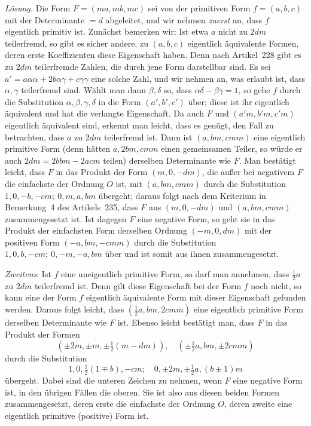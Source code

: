 \textit{Lösung.} Die Form $F=(ma,mb,mc)$ sei von der primitiven Form $f=(a,b,c)$ mit der Determinante $=d$ abgeleitet, und wir nehmen \textit{zuerst} an, dass $f$ eigentlich primitiv ist. Zunächst bemerken wir: Ist etwa $a$ nicht zu $2dm$ teilerfremd, so gibt es sicher andere, zu $(a,b,c)$ eigentlich äquivalente Formen, deren erste Koeffizienten diese Eigenschaft haben. Denn nach Artikel~228 gibt es zu $2dm$ teilerfremde Zahlen, die durch jene Form darstellbar sind. Es sei $a'=a\alpha\alpha+2b\alpha\gamma+c\gamma\gamma$ eine solche Zahl, und wir nehmen an, was erlaubt ist, dass $\alpha,\gamma$ teilerfremd sind. Wählt man dann $\beta,\delta$ so, dass $\alpha\delta-\beta\gamma=1$, so gehe $f$ durch die Substitution $\alpha,\beta,\gamma,\delta$ in die Form $(a',b',c')$ über; diese ist ihr eigentlich äquivalent und hat die verlangte Eigenschaft. Da auch $F$ und $(a'm,b'm,c'm)$ eigentlich äquivalent sind, erkennt man leicht, dass es genügt, den Fall zu betrachten, dass $a$ zu $2dm$ teilerfremd ist. Dann ist $(a,bm,cmm)$ eine eigentlich primitive Form (denn hätten $a,2bm,cmm$ einen gemeinsamen Teiler, so würde er auch $2dm=2bbm-2acm$ teilen) derselben Determinante wie $F$. Man bestätigt leicht, dass $F$ in das Produkt der Form $(m,0,-dm)$, die außer bei negativem $F$ die einfachste der Ordnung $O$ ist, mit $(a,bm,cmm)$ durch die Substitution $1,0,-b,-cm;\ 0,m,a,bm$ übergeht; daraus folgt nach dem Kriterium in Bemerkung~4 des Artikels~235, dass $F$ aus $(m,0,-dm)$ und $(a,bm,cmm)$ zusammengesetzt ist. Ist dagegen $F$ eine negative Form, so geht sie in das Produkt der einfachsten Form derselben Ordnung $(-m,0,dm)$ mit der positiven Form $(-a,bm,-cmm)$ durch die Substitution $1,0,b,-cm;\ 0,-m,-a,bm$ über und ist somit aus ihnen zusammengesetzt.

\textit{Zweitens}: Ist $f$ eine uneigentlich primitive Form, so darf man annehmen, dass $\frac{1}{2}a$ zu $2dm$ teilerfremd ist. Denn gilt diese Eigenschaft bei der Form $f$ noch nicht, so kann eine der Form $f$ eigentlich äquivalente Form mit dieser Eigenschaft gefunden werden. Daraus folgt leicht, dass $(\frac{1}{2}a,bm,2cmm)$ eine eigentlich primitive Form derselben Determinante wie $F$ ist. Ebenso leicht bestätigt man, dass $F$ in das Produkt der Formen
\[
(\pm2m,\pm m,\pm\tfrac{1}{2}(m-dm)),\quad
(\pm\tfrac{1}{2}a,bm,\pm2cmm)
\]
durch die Substitution
\[
1,0,\tfrac{1}{2}(1\mp b),-cm;\quad 0,\pm2m,\pm\tfrac{1}{2}a,(b\pm1)m
\]
übergeht. Dabei sind die unteren Zeichen zu nehmen, wenn $F$ eine negative Form ist, in den übrigen Fällen die oberen. Sie ist also aus diesen beiden Formen zusammengesetzt, deren erste die einfachste der Ordnung $O$, deren zweite eine eigentlich primitive (positive) Form ist.

